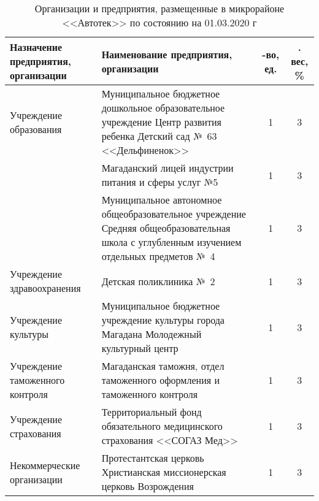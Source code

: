 \begin{table}[h!]
\caption{Организации и предприятия, размещенные в микрорайоне <<Автотек>> по состоянию на 01.03.2020 г}
\label{tab:kodirev-tab-1}
\begin{changemargin}{-1cm}{-1cm}
\begin{tabular}{p{5cm}p{7cm}cc}
   \toprule
Назначение предприятия, организации &
Наименование предприятия, организации &
 \parbox[c][][c]{0.1\textwidth}{ -во, ед.} &
  \parbox[c][][c]{0.1\textwidth}{ . вес, \%} \\
   \toprule
Учреждение 				образования              & Муниципальное 				бюджетное дошкольное образовательное 				учреждение Центр развития ребенка 				Детский сад №~63 <<Дельфиненок>>                            & 1               & 3               \\
                                        & Магаданский 				лицей индустрии питания и сферы услуг 				№5                                                                                              & 1               & 3               \\
                                        & Муниципальное 				автономное общеобразовательное 				учреждение Средняя общеобразовательная 				школа с углубленным изучением отдельных 				предметов №~4 & 1               & 3               \\ \midrule
Учреждение 				здравоохранения          & Детская 				поликлиника №~2                                                                                                                               & 1               & 3               \\ \midrule
Учреждение 				культуры                 & Муниципальное 				бюджетное учреждение культуры города 				Магадана Молодежный культурный центр                                                           & 1               & 3               \\ \midrule
Учреждение 				таможенного контроля     & Магаданская 				таможня, отдел таможенного оформления 				и таможенного контроля                                                                          & 1               & 3               \\ \midrule
Учреждение 				страхования              & Территориальный 				фонд обязательного медицинского 				страхования <<СОГАЗ Мед>>                                                                           & 1               & 3               \\ \midrule
Некоммерческие 				организации          & Протестантская 				церковь Христианская миссионерская 				церковь Возрождения                                                                             & 1               & 3               \\

\end{tabular}
\end{changemargin}
\end{table}
